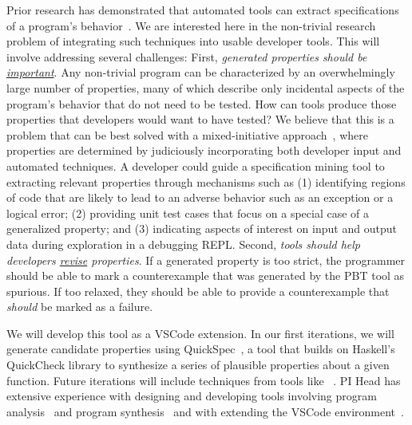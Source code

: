 Prior research has demonstrated that automated tools can extract
specifications of a program's behavior~\cite{ref:ammons2002mining,
  ref:le2018deep, ref:claessen2010quickspec}. We are interested here
in the non-trivial research problem of integrating such techniques
into usable developer tools. This will involve addressing several
challenges:
%
First, \textit{generated properties should be \underline{important}}. Any non-trivial
program can be characterized by an overwhelmingly large number of properties,
many of which describe only incidental aspects of the program's behavior that do
not need to be tested. How can tools produce those properties that developers
would want to have tested? We believe that this is a problem that can be best
solved with a mixed-initiative approach~\cite{ref:allen1999mixed}, where properties
are determined by judiciously incorporating both developer input and automated
techniques.
%
A developer could guide a specification mining tool to extracting relevant
properties through mechanisms such as (1) identifying regions of code that
are likely to lead to an adverse behavior such as an exception or a logical
error; (2) providing unit test cases that focus on a special case of a
generalized
property; and (3) indicating aspects of interest on input and output data during
exploration in a debugging REPL.
%
%
Second, \textit{tools should help developers \underline{revise}
  properties}. If a generated property is too strict,
the programmer should be able to mark
a counterexample that was generated by the PBT tool as spurious. If
too relaxed, they should be able to provide a
counterexample that {\em should} be marked as a failure.

We will develop this tool as
a VSCode extension. In our first iterations, we will generate
candidate properties using QuickSpec~\cite{ref:claessen2010quickspec}, a tool that
builds on Haskell's QuickCheck library to synthesize a series of plausible
properties about a given function. Future iterations will include
techniques from tools like
~\cite{smith_discovering_2017}.
%
PI Head has extensive experience with designing and developing tools
involving program
analysis~\cite{ref:head2018interactive,ref:head2019managing} and
program synthesis~\cite{ref:head2017writing} and with extending the
VSCode environment~\cite{ref:head2020composing}.

